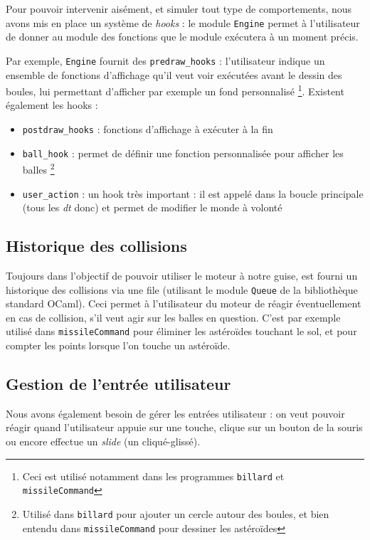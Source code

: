 \documentclass[a4paper]{scrartcl}
\begin{document}
Pour pouvoir intervenir aisément, et simuler tout type de
comportements, nous avons mis en place un système de \emph{hooks} : le
module \texttt{Engine} permet à l'utilisateur de donner au module des
fonctions que le module exécutera à un moment précis.

Par exemple, \texttt{Engine} fournit des \texttt{predraw\_hooks} :
l'utilisateur indique un ensemble de fonctions d'affichage qu'il veut
voir exécutées avant le dessin des boules, lui permettant d'afficher
par exemple un fond personnalisé \footnote{Ceci est utilisé notamment
  dans les programmes \texttt{billard} et \texttt{missileCommand}}.
Existent également les hooks :
\begin{itemize}
\item \texttt{postdraw\_hooks} : fonctions d'affichage à exécuter à la fin
\item \texttt{ball\_hook} : permet de définir une fonction
  personnalisée pour afficher les balles \footnote{Utilisé dans
    \texttt{billard} pour ajouter un cercle autour des boules, et bien
    entendu dans \texttt{missileCommand} pour dessiner les astéroïdes}
\item \texttt{user\_action} : un hook très important : il est appelé
  dans la boucle principale (tous les \emph{dt} donc) et permet de
  modifier le monde à volonté
\end{itemize}

\subsection{Historique des collisions}
Toujours dans l'objectif de pouvoir utiliser le moteur à notre guise,
est fourni un historique des collisions via une file (utilisant le
module \texttt{Queue} de la bibliothèque standard OCaml). Ceci permet
à l'utilisateur du moteur de réagir éventuellement en cas de
collision, s'il veut agir sur les balles en question. C'est par
exemple utilisé dans \texttt{missileCommand} pour éliminer les
astéroïdes touchant le sol, et pour compter les points lorsque l'on
touche un astéroïde.

\subsection{Gestion de l'entrée utilisateur}
Nous avons également besoin de gérer les entrées utilisateur : on veut
pouvoir réagir quand l'utilisateur appuie sur une touche, clique sur
un bouton de la souris ou encore effectue un \emph{slide} (un
cliqué-glissé).
\end{document}
